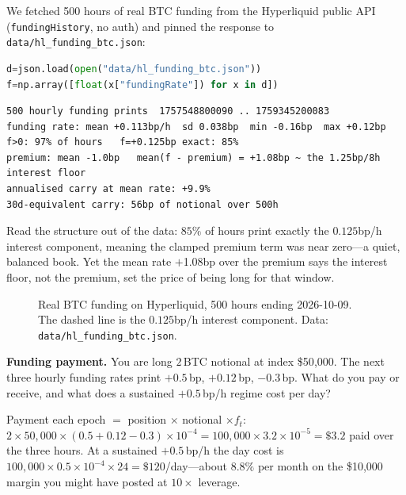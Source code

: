 We fetched 500 hours of real BTC funding from the Hyperliquid public API
(\texttt{fundingHistory}, no auth) and pinned the response to \texttt{data/hl\_funding\_btc.json}:

\begin{lstlisting}[language=Python, numbers=none]
d=json.load(open("data/hl_funding_btc.json"))
f=np.array([float(x["fundingRate"]) for x in d])
\end{lstlisting}
\begin{lstlisting}[numbers=none]
500 hourly funding prints  1757548800090 .. 1759345200083
funding rate: mean +0.113bp/h  sd 0.038bp  min -0.16bp  max +0.12bp
f>0: 97% of hours   f=+0.125bp exact: 85%
premium: mean -1.0bp   mean(f - premium) = +1.08bp ~ the 1.25bp/8h interest floor
annualised carry at mean rate: +9.9%
30d-equivalent carry: 56bp of notional over 500h
\end{lstlisting}

Read the structure out of the data: $85\%$ of hours print exactly the $0.125$bp/h interest
component, meaning the clamped premium term was near zero---a quiet, balanced book. Yet the
mean rate $+$1.08bp over the premium says the interest floor, not the premium, set the price of
being long for that window.

\begin{figure}[htbp]\centering

\caption{Real BTC funding on Hyperliquid, 500 hours ending 2026-10-09. The dashed line is the
$0.125$bp/h interest component. Data: \texttt{data/hl\_funding\_btc.json}.}
\label{fig:fundts}
\end{figure}

\begin{example}\label{ex:fundpay}
\textbf{Funding payment.} You are long $2$\,BTC notional at index \$50{,}000. The next three
hourly funding rates print $+0.5$\,bp, $+0.12$\,bp, $-0.3$\,bp. What do you pay or receive,
and what does a sustained $+0.5$\,bp/h regime cost per day?
\begin{solution}
Payment each epoch $=$ position $\times$ notional $\times f_t$:
$2\times 50{,}000 \times (0.5+0.12-0.3)\times 10^{-4}
 = 100{,}000\times 3.2\times 10^{-5} = \$3.2$ paid over the three hours.
At a sustained $+0.5$\,bp/h the day cost is
$100{,}000\times 0.5\times 10^{-4}\times 24 = \$120$/day---about $8.8\%$ per month on the
\$10{,}000 margin you might have posted at $10\times$ leverage.
\end{solution}
\end{example}


